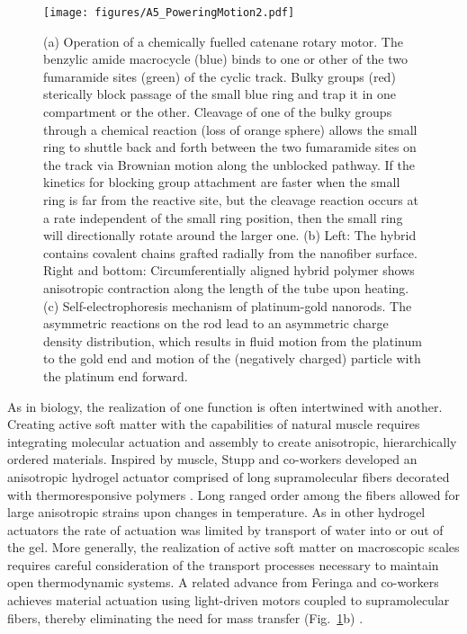 \begin{appendices}
\begin{figure}[h!]
    \centering
    \texttt{[image: figures/A5\_PoweringMotion2.pdf]}
    \caption{(a) Operation of a chemically fuelled catenane rotary motor. The benzylic amide macrocycle (blue) binds to one or other of the two fumaramide sites (green) of the cyclic track. Bulky groups (red) sterically block passage of the small blue ring and trap it in one compartment or the other. Cleavage of one of the bulky groups through a chemical reaction (loss of orange sphere) allows the small ring to shuttle back and forth between the two fumaramide sites on the track via Brownian motion along the unblocked pathway. If the kinetics for blocking group attachment are faster when the small ring is far from the reactive site, but the cleavage reaction occurs at a rate independent of the small ring position, then the small ring will directionally rotate around the larger one.  (b) Left: The  hybrid contains covalent chains grafted radially from the nanofiber surface. Right and bottom: Circumferentially aligned hybrid polymer shows anisotropic contraction along the length of the tube upon heating.  (c) Self-electrophoresis mechanism of platinum-gold nanorods. The asymmetric reactions on the rod lead to an asymmetric charge density distribution, which results in fluid motion from the platinum to the gold end and motion of the (negatively charged) particle with the platinum end forward. }
    \label{fig:PoweringMotion2}
\end{figure}

As in biology, the realization of one function is often intertwined with another. Creating active soft matter with the capabilities of natural muscle requires integrating molecular actuation and assembly to create anisotropic, hierarchically ordered materials.  Inspired by muscle, Stupp and co-workers developed an anisotropic hydrogel actuator comprised of long supramolecular fibers decorated with thermoresponsive polymers \cite{chin2018covalent}.  Long ranged order among the fibers allowed for large anisotropic strains upon changes in temperature.  As in other hydrogel actuators the rate of actuation was limited by transport of water into or out of the gel. More generally, the realization of active soft matter on macroscopic scales requires careful consideration of the transport processes necessary to maintain open thermodynamic systems. A related advance from Feringa and co-workers achieves material actuation using light-driven motors coupled to supramolecular fibers, thereby eliminating the need for mass transfer (Fig.~\ref{fig:PoweringMotion2}b) \cite{chen2018artificial}.


\end{appendices}
